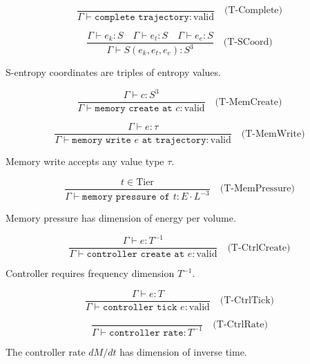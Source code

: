 \documentclass[twocolumn,10pt]{article}
\theoremstyle{definition}
\theoremstyle{remark}
\begin{document}
\begin{equation}
    \frac{}{\Gamma \vdash \texttt{complete trajectory} : \text{valid}}
    \quad \text{(T-Complete)}
\end{equation}

\begin{equation}
    \frac{\Gamma \vdash e_k : S \quad \Gamma \vdash e_t : S \quad \Gamma \vdash e_e : S}{\Gamma \vdash S(e_k, e_t, e_e) : S^3}
    \quad \text{(T-SCoord)}
\end{equation}

S-entropy coordinates are triples of entropy values.

\begin{equation}
    \frac{\Gamma \vdash c : S^3}{\Gamma \vdash \texttt{memory create at } c : \text{valid}}
    \quad \text{(T-MemCreate)}
\end{equation}

\begin{equation}
    \frac{\Gamma \vdash e : \tau}{\Gamma \vdash \texttt{memory write } e \texttt{ at trajectory} : \text{valid}}
    \quad \text{(T-MemWrite)}
\end{equation}

Memory write accepts any value type $\tau$.

\begin{equation}
    \frac{t \in \text{Tier}}{\Gamma \vdash \texttt{memory pressure of } t : E \cdot L^{-3}}
    \quad \text{(T-MemPressure)}
\end{equation}

Memory pressure has dimension of energy per volume.

\begin{equation}
    \frac{\Gamma \vdash e : T^{-1}}{\Gamma \vdash \texttt{controller create at } e : \text{valid}}
    \quad \text{(T-CtrlCreate)}
\end{equation}

Controller requires frequency dimension $T^{-1}$.

\begin{equation}
    \frac{\Gamma \vdash e : T}{\Gamma \vdash \texttt{controller tick } e : \text{valid}}
    \quad \text{(T-CtrlTick)}
\end{equation}

\begin{equation}
    \frac{}{\Gamma \vdash \texttt{controller rate} : T^{-1}}
    \quad \text{(T-CtrlRate)}
\end{equation}

The controller rate $dM/dt$ has dimension of inverse time.
\end{document}

